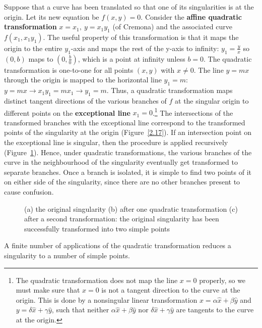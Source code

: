 Suppose that a curve has been translated so that one of its singularities
is at the origin.
Let its new equation be $f(x,y)=0$.
Consider the {\bf affine quadratic transformation} $x = x_{1},\ y = x_{1}y_{1}$
(of Cremona) \cite{wa} and the associated curve $f(x_{1},x_{1}y_{1})$.
The useful property of this transformation is that it maps the origin
to the entire $y_{1}$-axis and maps the rest of the y-axis to infinity:
$y_{1} = \frac{y}{x}$ so $(0,b)$ 
maps to $(0,\frac{b}{0})$, which is a point at
infinity unless $b=0$.
The quadratic transformation is one-to-one for all points $(x,y)$ with $x \neq 0$.
The line $y = mx$ through the origin is mapped to the horizontal line 
$y_{1}=m$:
$y=mx \rightarrow  x_{1}y_{1} = mx_{1}  \rightarrow  y_{1}=m$.
Thus, a quadratic transformation maps distinct tangent directions of the
various branches of $f$ at the singular origin to different
points on the {\bf exceptional line} $x_{1} =0$.\footnote{The quadratic
transformation does not map the line $x=0$ properly, so we must make sure
that $x=0$ is not a tangent direction to the curve at the origin.
This is done by a nonsingular linear transformation $x = \alpha\hat{x}+\beta\hat{y}$
and $y = \delta\hat{x} + \gamma\hat{y}$, such that
neither $\alpha\hat{x}+\beta\hat{y}$ nor
$\delta\hat{x} + \gamma\hat{y}$ are tangents to the curve at the origin.}
The intersections of the transformed branches with the exceptional
line correspond to the transformed points of the singularity at the 
%
%
origin (Figure~\ref{2.17}).
If an intersection point on the exceptional line is singular, 
then the procedure is applied recursively (Figure~\ref{18}).
Hence, under quadratic transformations, the various branches of the 
curve in the neighbourhood of the singularity eventually 
get transformed to separate branches.
Once a branch is isolated, it is simple to find two points of it
on either side of the singularity, since there are no other branches
present to cause confusion. 

\begin{figure}[htbp]\vspace{5.25in}\caption{(a) the original singularity (b) after one quadratic transformation
(c) after a second transformation: the original singularity has been 
successfully transformed into two simple points}\label{18}\end{figure}
%
%

\begin{lemma}
A finite number of applications of the quadratic transformation reduces
a singularity to a number of simple points.
\end{lemma}
%

